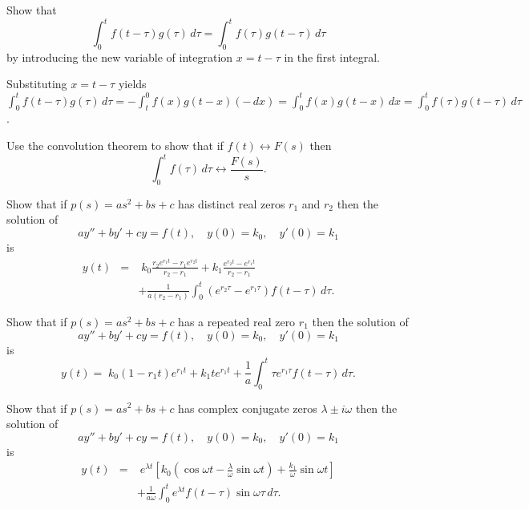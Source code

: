 \documentclass{ximera}
\begin{document}
\begin{problem}\label{exer:8.6.6}
 Show that
$$
\int_0^tf(t-\tau)g(\tau)\,d\tau=\int_0^tf(\tau)g(t-\tau)\,d\tau
$$
by introducing the new variable of integration $x=t-\tau$ in the first
integral.

\begin{solution}
Substituting $x=t-\tau$ yields
$\int_0^tf(t-\tau)g(\tau)\,d\tau=-\int_t^0f(x)g(t-x)(-\,dx)=
\int_0^tf(x)g(t-x)\,dx=\int_0^tf(\tau)g(t-\tau)\,d\tau$.
\end{solution}
\end{problem}

\begin{problem}\label{exer:8.6.7} Use the convolution theorem to show that if
$f(t)\leftrightarrow F(s)$ then
$$
\int_0^tf(\tau)\,d\tau\leftrightarrow \frac{F(s)}{s}.
$$
\end{problem}

\begin{problem}\label{exer:8.6.8}
 Show that if $p(s)=as^2+bs+c$ has
distinct real zeros $r_1$ and $r_2$ then the solution of
$$
ay''+by'+cy=f(t),\quad y(0)=k_0,\quad y'(0)=k_1
$$
is
\begin{eqnarray*}
y(t)&=&\; k_0\frac{r_2e^{r_1t}-r_1e^{r_2t}}{r_2-r_1}+k_1\frac{e^{r_2t}-e^{r_1t}
}{r_2-r_1}
\\
&&+\frac{1}{a(r_2-r_1)}\int_0^t(e^{r_2\tau}-e^{r_1\tau})f(t-\tau)\,d\tau.
\end{eqnarray*}
\end{problem}

\begin{problem}\label{exer:8.6.9}
Show that if $p(s)=as^2+bs+c$ has
a repeated  real zero $r_1$ then
 the solution of
$$
ay''+by'+cy=f(t),\quad y(0)=k_0,\quad y'(0)=k_1
$$
is
$$
y(t)=\; k_0(1-r_1t)e^{r_1t}+k_1te^{r_1t}
+\frac{1}{a}\int_0^t\tau
e^{r_1\tau}f(t-\tau)\,d\tau.
$$
\end{problem}

\begin{problem}\label{exer:8.6.10}
 Show that if $p(s)=as^2+bs+c$ has
 complex conjugate zeros $\lambda\pm i\omega$
then the solution of
$$
ay''+by'+cy=f(t),\quad y(0)=k_0,\quad y'(0)=k_1
$$
is
\begin{eqnarray*}
y(t)&=&\;  e^{\lambda t}\left[k_0(\cos\omega t-\frac{\lambda}{\omega}\sin\omega
t)+\frac{k_1}{\omega}\sin\omega t\right]
\\
&&+\frac{1}{a\omega}\int_0^te^{\lambda t}f(t-\tau)\sin\omega\tau\,
d\tau.
\end{eqnarray*}
\end{problem}
\end{document}

